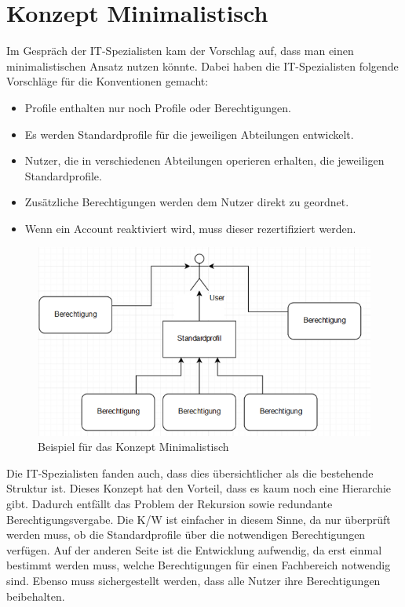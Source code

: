 \newpage
\section{Konzept Minimalistisch}
\label{sec:chapter04:minimal}
Im Gespräch der IT-Spezialisten kam der Vorschlag auf, dass man einen minimalistischen Ansatz nutzen könnte.
Dabei haben die IT-Spezialisten folgende Vorschläge für die Konventionen gemacht:
\newline
\begin{itemize}
	\item Profile enthalten nur noch Profile oder Berechtigungen.
	\item Es werden Standardprofile für die jeweiligen Abteilungen entwickelt.
	\item Nutzer, die in verschiedenen Abteilungen operieren erhalten, die jeweiligen Standardprofile.
	\item Zusätzliche Berechtigungen werden dem Nutzer direkt zu geordnet.
	\item Wenn ein Account reaktiviert wird, muss dieser rezertifiziert werden.
\end{itemize}
\begin{figure}[h!]
 \centering
 \includegraphics[width=1\textwidth]{gfx/Picture/Minimal.PNG}
 \caption{Beispiel für das Konzept Minimalistisch}
 \label{fig:Min}
\end{figure}
Die IT-Spezialisten fanden auch, dass dies übersichtlicher als die bestehende Struktur ist.
Dieses Konzept hat den Vorteil, dass es kaum noch eine Hierarchie gibt.
Dadurch entfällt das Problem der Rekursion sowie redundante Berechtigungsvergabe.
Die \ac{K/W} ist einfacher in diesem Sinne, da nur überprüft werden muss, ob die Standardprofile über die notwendigen Berechtigungen verfügen.
Auf der anderen Seite ist die Entwicklung aufwendig, da erst einmal bestimmt werden muss, welche Berechtigungen für einen Fachbereich notwendig sind. Ebenso muss sichergestellt werden, dass alle Nutzer ihre Berechtigungen beibehalten.
